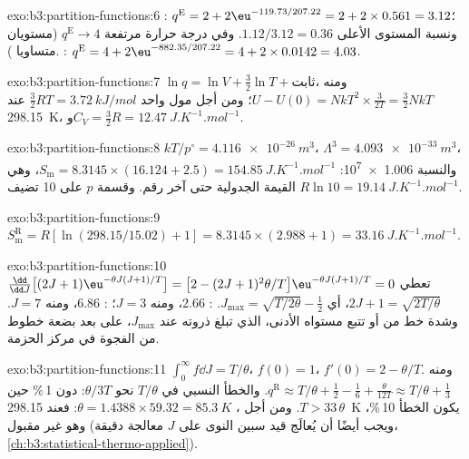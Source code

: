 \begin{solution}{exo:b3:partition-functions:6}
: $q^{\mathrm E} = 2 + 2\eu^{-119.73/207.22} = 2 + 2 \times 0.561 = 3.12$؛ ونسبة المستوى الأعلى $1.12/3.12
= 0.36$. وفي درجة حرارة مرتفعة $q^{\mathrm E} \to 4$ (مستويان متساويا ). :
$q^{\mathrm E} = 4 + 2\eu^{-882.35/207.22} = 4 + 2 \times 0.0142 = 4.03$.
\end{solution}

\begin{solution}{exo:b3:partition-functions:7}
$\ln q = \ln V + \frac32\ln T + \text{ثابت}$، ومنه $U - U(0) = NkT^2 \times \frac{3}{2T} = \frac32NkT$؛ ومن أجل
مول واحد $\frac32RT = \qty{3.72}{kJ/mol}$ عند \qty{298.15}{K}، و$C_V = \frac32R = \qty{12.47}{J.K^{-1}.mol^{-1}}$.
\end{solution}

\begin{solution}{exo:b3:partition-functions:8}
$kT/p^\circ = \qty{4.116e-26}{m^3}$، $\Lambda^3 = \qty{4.093e-33}{m^3}$، والنسبة \num{1.006e7}:
$S_{\mathrm m} = 8.3145 \times (16.124 + 2.5) = \qty{154.85}{J.K^{-1}.mol^{-1}}$، وهي القيمة الجدولية حتى
آخر رقم. وقسمة $p$ على 10 تضيف $R\ln10 = \qty{19.14}{J.K^{-1}.mol^{-1}}$.
\end{solution}

\begin{solution}{exo:b3:partition-functions:9}
$S^{\mathrm R}_{\mathrm m} = R[\ln(298.15/15.02) + 1] = 8.3145 \times (2.988 + 1) = \qty{33.16}{J.K^{-1}.mol^{-1}}$.
\end{solution}

\begin{solution}{exo:b3:partition-functions:10}
$\frac{\dd}{\dd J}\bigl[(2J+1)\eu^{-\theta J(J+1)/T}\bigr] = \bigl[2 - (2J+1)^2\theta/T\bigr]\eu^{-\theta J(J+1)/T} = 0$ تعطي
$2J + 1 = \sqrt{2T/\theta}$، أي $J_{\max} = \sqrt{T/2\theta} - \frac12$. : 2.66، ومنه $J = 3$؛ :
6.86، ومنه $J = 7$. وشدة خط من  أو  تتبع
 مستواه الأدنى، الذي تبلغ ذروته عند $J_{\max}$، على بعد بضعة خطوط من الفجوة
في مركز الحزمة.
\end{solution}

\begin{solution}{exo:b3:partition-functions:11}
$\int_0^\infty f\dd J = T/\theta$، $f(0) = 1$، $f'(0) = 2 - \theta/T$. ومنه $q^{\mathrm R} \approx T/\theta + \frac12 -
\frac16 + \frac{\theta}{12T} \approx T/\theta + \frac13$. والخطأ النسبي في $T/\theta$ نحو $\theta/3T$:
دون 1\,\% حين $T > 33\,\theta$. ومن أجل ، $\theta = 1.4388 \times 59.32 = \qty{85.3}{K}$: فعند
\qty{298.15}{K} يكون الخطأ 10\,\%، وهو غير مقبول (ويجب أيضًا أن يُعالَج قيد سبين النوى
على $J$ معالجة دقيقة، \cref{ch:b3:statistical-thermo-applied}).
\end{solution}

